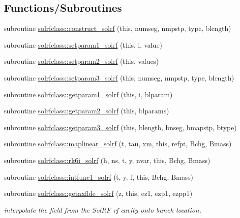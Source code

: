 \subsection*{Functions/\+Subroutines}
\begin{DoxyCompactItemize}
\item 
subroutine \mbox{\hyperlink{namespacesolrfclass_a3d7deb451633bf4e6fc42e0b43f21e2e}{solrfclass\+::construct\+\_\+solrf}} (this, numseg, nmpstp, type, blength)
\item 
subroutine \mbox{\hyperlink{namespacesolrfclass_ad06b3becdb99ba947f714809bea2af35}{solrfclass\+::setparam1\+\_\+solrf}} (this, i, value)
\item 
subroutine \mbox{\hyperlink{namespacesolrfclass_a4f5cee7483285ca745064b5331f3c30f}{solrfclass\+::setparam2\+\_\+solrf}} (this, values)
\item 
subroutine \mbox{\hyperlink{namespacesolrfclass_ae51249f1d976b6ff71436430614a854e}{solrfclass\+::setparam3\+\_\+solrf}} (this, numseg, nmpstp, type, blength)
\item 
subroutine \mbox{\hyperlink{namespacesolrfclass_af623613497d4af2070e81c255374535e}{solrfclass\+::getparam1\+\_\+solrf}} (this, i, blparam)
\item 
subroutine \mbox{\hyperlink{namespacesolrfclass_ac8cc63a77159c54d547e156bf816e7d1}{solrfclass\+::getparam2\+\_\+solrf}} (this, blparams)
\item 
subroutine \mbox{\hyperlink{namespacesolrfclass_abb727d5c5f8ebd6af19e036fe9204923}{solrfclass\+::getparam3\+\_\+solrf}} (this, blength, bnseg, bmapstp, btype)
\item 
subroutine \mbox{\hyperlink{namespacesolrfclass_a70f5e9afe73a56ed66363e6ca3207226}{solrfclass\+::maplinear\+\_\+solrf}} (t, tau, xm, this, refpt, Bchg, Bmass)
\item 
subroutine \mbox{\hyperlink{namespacesolrfclass_a47bcede8ab38e0e035ef1be479490018}{solrfclass\+::rk6i\+\_\+solrf}} (h, ns, t, y, nvar, this, Bchg, Bmass)
\item 
subroutine \mbox{\hyperlink{namespacesolrfclass_aaf806853862c8c4b3f448ca750500178}{solrfclass\+::intfunc1\+\_\+solrf}} (t, y, f, this, Bchg, Bmass)
\item 
subroutine \mbox{\hyperlink{namespacesolrfclass_a1033b422b682ef72ecc3b482c38b5065}{solrfclass\+::getaxflde\+\_\+solrf}} (z, this, ez1, ezp1, ezpp1)
\begin{DoxyCompactList}\small\item\em interpolate the field from the Sol\+RF rf cavity onto bunch location. \end{DoxyCompactList}\item 

\end{DoxyCompactItemize}
